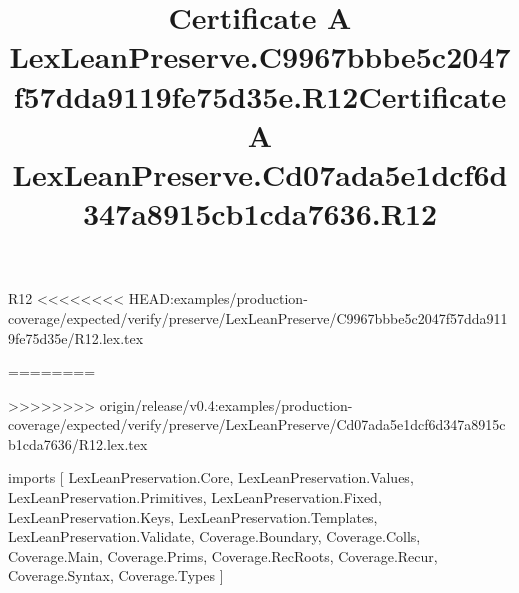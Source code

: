 \begin{lexlean}{R12}
<<<<<<<< HEAD:examples/production-coverage/expected/verify/preserve/LexLeanPreserve/C9967bbbe5c2047f57dda9119fe75d35e/R12.lex.tex
\title{Certificate A LexLeanPreserve.C9967bbbe5c2047f57dda9119fe75d35e.R12}
========
\title{Certificate A LexLeanPreserve.Cd07ada5e1dcf6d347a8915cb1cda7636.R12}
>>>>>>>> origin/release/v0.4:examples/production-coverage/expected/verify/preserve/LexLeanPreserve/Cd07ada5e1dcf6d347a8915cb1cda7636/R12.lex.tex
\begin{coremodule}
imports [
  LexLeanPreservation.Core,
  LexLeanPreservation.Values,
  LexLeanPreservation.Primitives,
  LexLeanPreservation.Fixed,
  LexLeanPreservation.Keys,
  LexLeanPreservation.Templates,
  LexLeanPreservation.Validate,
  Coverage.Boundary,
  Coverage.Colls,
  Coverage.Main,
  Coverage.Prims,
  Coverage.RecRoots,
  Coverage.Recur,
  Coverage.Syntax,
  Coverage.Types
]


\end{coremodule}
\end{lexlean}

